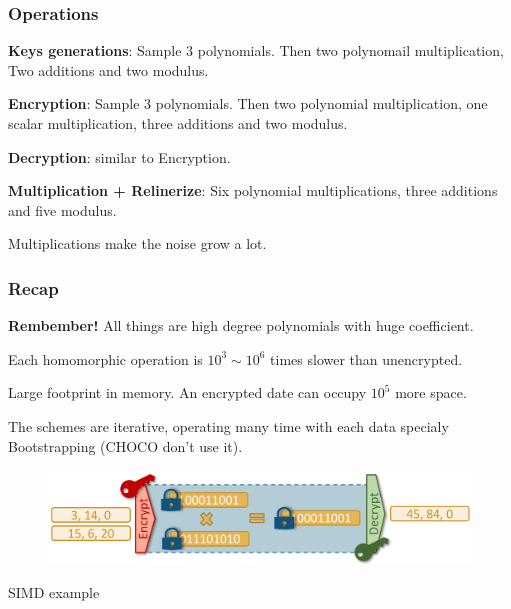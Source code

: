 \documentclass[10pt,handout]{beamer}
\begin{document}
\begin{frame}
\frametitle{Operations}

    \textbf{Keys generations}: Sample 3 polynomials. Then two polynomail multiplication, Two additions and two modulus.

    \textbf{Encryption}: Sample 3 polynomials. Then two polynomial multiplication, one scalar multiplication, three additions and two modulus.

    \textbf{Decryption}: similar to Encryption.

    \textbf{Multiplication + Relinerize}: Six polynomial multiplications, three additions and five modulus.

   Multiplications make the noise grow a lot.


\end{frame}



\begin{frame}
\frametitle{Recap}

    \textbf{Rembember!} All things are high degree polynomials with huge coefficient.

Each homomorphic operation is $10^3 \sim 10^6$ times slower than unencrypted.
\pause

Large footprint in memory.
An encrypted date can occupy $10^5$ more space.

\pause
    The schemes are iterative, operating many time with each data specialy Bootstrapping (CHOCO don't use it).

        \begin{figure}[h!]
            \centering
            \includegraphics[scale=0.8]{workflow.png}
        \end{figure}
    \centering
        SIMD example

\end{frame}
\end{document}
